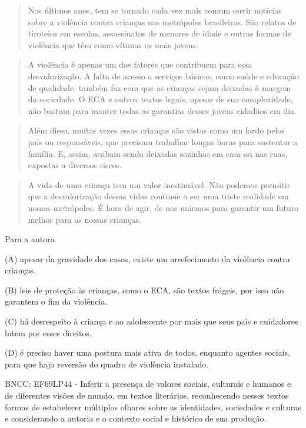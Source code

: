 \begin{itemize}
\begin{itemize}
\begin{quote}
Nos últimos anos, tem se tornado cada vez mais comum ouvir notícias
sobre a violência contra crianças nas metrópoles brasileiras. São
relatos de tiroteios em escolas, assassinatos de menores de idade e
outras formas de violência que têm como vítimas os mais jovens.
\end{quote}

\begin{quote}
A violência é apenas um dos fatores que contribuem para essa
desvalorização. A falta de acesso a serviços básicos, como saúde e
educação de qualidade, também faz com que as crianças sejam deixadas à
margem da sociedade. O ECA e outrox textos legais, apesar de sua
complexidade, não bastam para manter todas as garantias desses jovens
cidadãos em dia.
\end{quote}

\begin{quote}
Além disso, muitas vezes essas crianças são vistas como um fardo pelos
pais ou responsáveis, que precisam trabalhar longas horas para sustentar
a família. E, assim, acabam sendo deixadas sozinhas em casa ou nas ruas,
expostas a diversos riscos.
\end{quote}

\begin{quote}
A vida de uma criança tem um valor inestimável. Não podemos permitir que
a desvalorização dessas vidas continue a ser uma triste realidade em
nossas metrópoles. É hora de agir, de nos unirmos para garantir um
futuro melhor para as nossas crianças.
\end{quote}


Para a autora

(A) apesar da gravidade dos casos, existe um arrefecimento da violência
contra crianças.

(B) leis de proteção às crianças, como o ECA, são textos frágeis, por
isso não garantem o fim da violência.

(C) há desrespeito à criança e ao adolescente por mais que seus pais e
cuidadores lutem por esses direitos.

(D) é preciso haver uma postura mais ativa de todos, enquanto agentes
sociais, para que haja reversão do quadro de violência instalado.

BNCC: EF69LP44 - Inferir a presença de valores sociais, culturais e
humanos e de diferentes visões de mundo, em textos literários,
reconhecendo nesses textos formas de estabelecer múltiplos olhares sobre
as identidades, sociedades e culturas e considerando a autoria e o
contexto social e histórico de sua produção.


\end{itemize}
\end{itemize}
